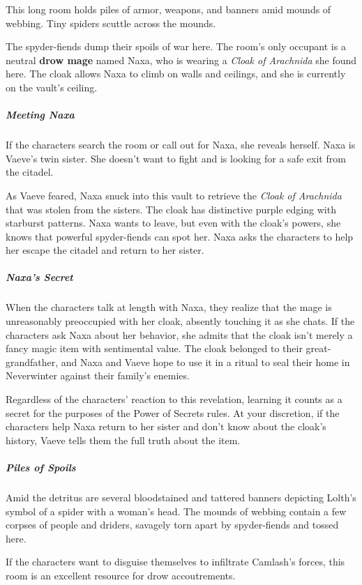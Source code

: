 \documentclass[10pt,a4paper,twoside,bg=print,twocolumn,openany,nodeprecatedcode]{dndbook}
\begin{document}
\begin{DndReadAloud}{}
This long room holds piles of armor, weapons, and banners amid mounds of webbing. Tiny spiders scuttle across the mounds.

\end{DndReadAloud}

The spyder-fiends dump their spoils of war here. The room's only occupant is a neutral \textbf{drow mage} named Naxa, who is wearing a \textit{Cloak of Arachnida} she found here. The cloak allows Naxa to climb on walls and ceilings, and she is currently on the vault's ceiling.

\subparagraph{Meeting Naxa}
If the characters search the room or call out for Naxa, she reveals herself. Naxa is Vaeve's twin sister. She doesn't want to fight and is looking for a safe exit from the citadel.

As Vaeve feared, Naxa snuck into this vault to retrieve the \textit{Cloak of Arachnida} that was stolen from the sisters. The cloak has distinctive purple edging with starburst patterns. Naxa wants to leave, but even with the cloak's powers, she knows that powerful spyder-fiends can spot her. Naxa asks the characters to help her escape the citadel and return to her sister.

\subparagraph{Naxa's Secret}
When the characters talk at length with Naxa, they realize that the mage is unreasonably preoccupied with her cloak, absently touching it as she chats. If the characters ask Naxa about her behavior, she admits that the cloak isn't merely a fancy magic item with sentimental value. The cloak belonged to their great-grandfather, and Naxa and Vaeve hope to use it in a ritual to seal their home in Neverwinter against their family's enemies.

Regardless of the characters' reaction to this revelation, learning it counts as a secret for the purposes of the Power of Secrets rules. At your discretion, if the characters help Naxa return to her sister and don't know about the cloak's history, Vaeve tells them the full truth about the item.

\subparagraph{Piles of Spoils}
Amid the detritus are several bloodstained and tattered banners depicting Lolth's symbol of a spider with a woman's head. The mounds of webbing contain a few corpses of people and driders, savagely torn apart by spyder-fiends and tossed here.

If the characters want to disguise themselves to infiltrate Camlash's forces, this room is an excellent resource for drow accoutrements.
\end{document}
